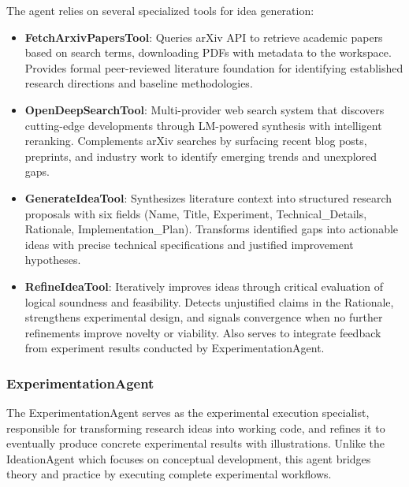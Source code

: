 \documentclass{article}
\begin{document}

The agent relies on several specialized tools for idea generation:
\begin{itemize}
\item \textbf{FetchArxivPapersTool}: Queries arXiv API to retrieve academic papers based on search terms, downloading PDFs with metadata to the workspace. Provides formal peer-reviewed literature foundation for identifying established research directions and baseline methodologies.
\item \textbf{OpenDeepSearchTool}: Multi-provider web search system \cite{alzubi2025opendeepsearchdemocratizing} that discovers cutting-edge developments through LM-powered synthesis with intelligent reranking. Complements arXiv searches by surfacing recent blog posts, preprints, and industry work to identify emerging trends and unexplored gaps.
\item \textbf{GenerateIdeaTool}: Synthesizes literature context into structured research proposals with six fields (Name, Title, Experiment, Technical\_Details, Rationale, Implementation\_Plan). Transforms identified gaps into actionable ideas with precise technical specifications and justified improvement hypotheses.
\item \textbf{RefineIdeaTool}: Iteratively improves ideas through critical evaluation of logical soundness and feasibility. Detects unjustified claims in the Rationale, strengthens experimental design, and signals convergence when no further refinements improve novelty or viability. Also serves to integrate feedback from experiment results conducted by ExperimentationAgent.
\end{itemize}

\subsubsection*{ExperimentationAgent}
The ExperimentationAgent serves as the experimental execution specialist, responsible for transforming research ideas into working code, and refines it to eventually produce concrete experimental results with illustrations. Unlike the IdeationAgent which focuses on conceptual development, this agent bridges theory and practice by executing complete experimental workflows.
\end{document}
